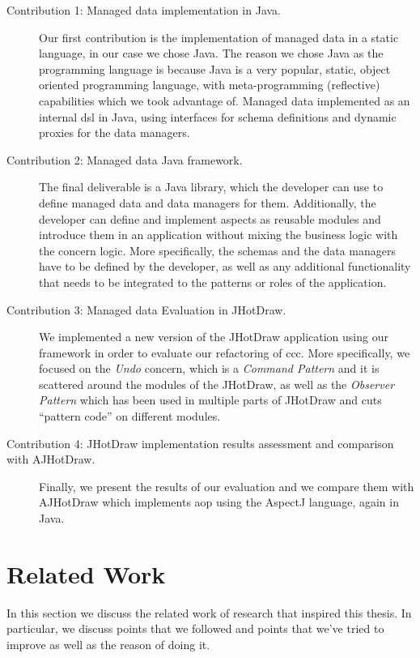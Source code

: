 \begin{description}
  \item[Contribution 1: Managed data implementation in Java.]
  Our first contribution is the implementation of managed data in a static language, in our case we chose Java.
  The reason we chose Java as the programming language is because Java is a very popular, static, object oriented programming language, with meta-programming (reflective) capabilities which we took advantage of.
  Managed data implemented as an internal \ac{dsl} in Java, using interfaces for schema definitions and dynamic proxies
  for the data managers.

  \item[Contribution 2: Managed data Java framework.]
  The final deliverable is a Java library, which the developer can use to define managed data and data managers for them. 
  Additionally, the developer can define and implement aspects as reusable modules and introduce them in an application without mixing the business logic with the concern logic. 
  More specifically, the schemas and the data managers have to be defined by the developer, as well as any additional functionality that needs to be integrated to the patterns or roles of the application.

  \item[Contribution 3: Managed data Evaluation in JHotDraw.]
  We implemented a new version of the JHotDraw application using our framework in order to evaluate our refactoring of \ac{ccc}.
  More specifically, we focused on the \textit{Undo} concern, which is a \textit{Command Pattern} and it is scattered around the modules of the JHotDraw, as well as the \textit{Observer Pattern} which has been used in multiple parts of JHotDraw and cuts ``pattern code'' on different modules.

  \item[Contribution 4: JHotDraw implementation results assessment and comparison with AJHotDraw.]
  Finally, we present the results of our evaluation and we compare them with AJHotDraw which implements \ac{aop} using the AspectJ language, again in Java.

\end{description}

\section{Related Work}\label{Related Work}
In this section we discuss the related work of research that inspired this thesis.
In particular, we discuss points that we followed and points that we've tried to improve as well as the reason of doing it.

